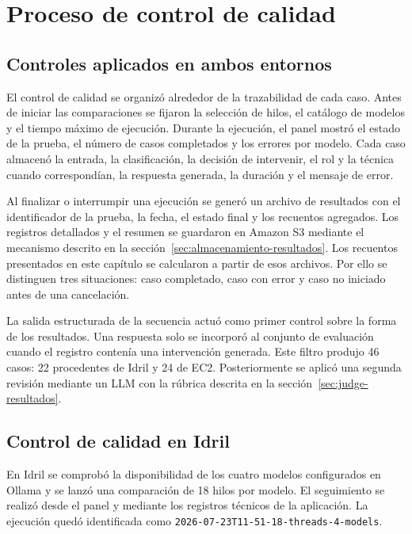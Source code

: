 \section{Proceso de control de calidad}

\subsection{Controles aplicados en ambos entornos}

El control de calidad se organizó alrededor de la trazabilidad de cada caso. Antes de iniciar las comparaciones se fijaron la selección de hilos, el catálogo de modelos y el tiempo máximo de ejecución. Durante la ejecución, el panel mostró el estado de la prueba, el número de casos completados y los errores por modelo. Cada caso almacenó la entrada, la clasificación, la decisión de intervenir, el rol y la técnica cuando correspondían, la respuesta generada, la duración y el mensaje de error.

Al finalizar o interrumpir una ejecución se generó un archivo de resultados con el identificador de la prueba, la fecha, el estado final y los recuentos agregados. Los registros detallados y el resumen se guardaron en Amazon S3 mediante el mecanismo descrito en la sección~\ref{sec:almacenamiento-resultados}. Los recuentos presentados en este capítulo se calcularon a partir de esos archivos. Por ello se distinguen tres situaciones: caso completado, caso con error y caso no iniciado antes de una cancelación.

La salida estructurada de la secuencia actuó como primer control sobre la forma de los resultados. Una respuesta solo se incorporó al conjunto de evaluación cuando el registro contenía una intervención generada. Este filtro produjo 46 casos: 22 procedentes de Idril y 24 de EC2. Posteriormente se aplicó una segunda revisión mediante un LLM con la rúbrica descrita en la sección~\ref{sec:judge-resultados}.

\subsection{Control de calidad en Idril}

En Idril se comprobó la disponibilidad de los cuatro modelos configurados en Ollama y se lanzó una comparación de 18 hilos por modelo. El seguimiento se realizó desde el panel y mediante los registros técnicos de la aplicación. La ejecución quedó identificada como \texttt{2026-07-23T11-51-18-threads-4-models}.

